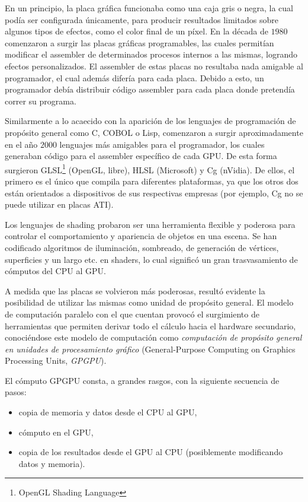 En un principio, la placa gráfica funcionaba como una caja gris o negra, la cual podía ser configurada únicamente, para producir resultados limitados sobre algunos tipos de efectos, como el color final de un píxel.
En la década de $1980$ comenzaron a surgir las placas gráficas programables, las cuales permitían modificar el assembler de determinados procesos internos a las mismas, logrando efectos personalizados.
El assembler de estas placas no resultaba nada amigable al programador, el cual además difería para cada placa.
Debido a esto, un programador debía distribuir código assembler para cada placa donde pretendía correr su programa.

Similarmente a lo acaecido con la aparición de los lenguajes de programación de propósito general como C, COBOL o Lisp, comenzaron a surgir aproximadamente en el año $2000$ lenguajes más amigables para el programador, los cuales generaban código para el assembler específico de cada GPU.
De esta forma surgieron GLSL\footnote{OpenGL Shading Language} (OpenGL, libre), HLSL (Microsoft) y Cg (nVidia).
De ellos, el primero es el único que compila para diferentes plataformas, ya que los otros dos están orientados a dispositivos de sus respectivas empresas (por ejemplo, Cg no se puede utilizar en placas ATI).

Los lenguajes de shading probaron ser una herramienta flexible y poderosa para controlar el comportamiento y apariencia de objetos en una escena.
Se han codificado algoritmos de iluminación, sombreado, de generación de vértices, superficies y un largo etc. en shaders, lo cual significó un gran trasvasamiento de cómputos del CPU al GPU.

A medida que las placas se volvieron más poderosas, resultó evidente la posibilidad de utilizar las mismas como unidad de propósito general.
El modelo de computación paralelo con el que cuentan provocó el surgimiento de herramientas que permiten derivar todo el cálculo hacia el hardware secundario, conoci\'endose este modelo de computaci\'on como {\em computación de propósito general en unidades de procesamiento gráfico} (General-Purpose Computing on Graphics Processing Units, {\em \acrshort{GPGPU}}).

El cómputo GPGPU consta, a grandes rasgos, con la siguiente secuencia de pasos: 

\begin{itemize}
\item copia de memoria y datos desde el CPU al GPU,
\item cómputo en el GPU, 
\item copia de los resultados desde el GPU al CPU (posiblemente modificando datos y memoria).
\end{itemize}

